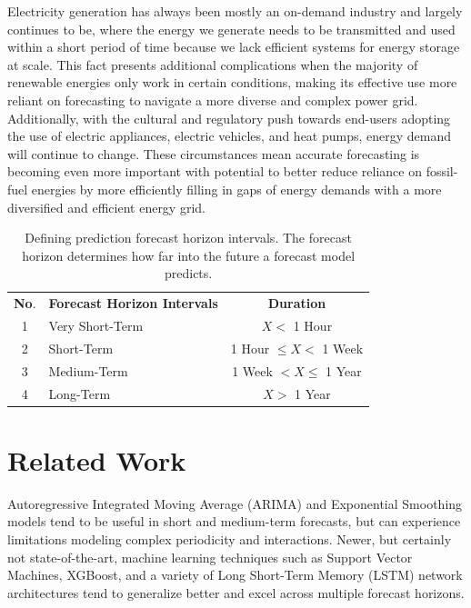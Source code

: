 \documentclass[sigconf]{acmart}
\begin{document}
Electricity generation has always been mostly an on-demand industry and largely continues to be, where the energy we generate needs to be transmitted and used within a short period of time because we lack efficient systems for energy storage at scale.\cite{Lai21} This fact presents additional complications when the majority of renewable energies only work in certain conditions, making its effective use more reliant on forecasting to navigate a more diverse and complex power grid. Additionally,  with the cultural and regulatory push towards end-users adopting the use of electric appliances, electric vehicles, and heat pumps, energy demand will continue to change.\cite{Archsmith22} These circumstances mean accurate forecasting is becoming even more important with potential to better reduce reliance on fossil-fuel energies by more efficiently filling in gaps of energy demands with a more diversified and efficient energy grid.

\begin{table}
\centering
\caption{Defining prediction forecast horizon intervals. The forecast horizon determines how far into the future a forecast model predicts.}
\begin{tabular}{clc}
\toprule
\hfill \textbf{No}. & \hfil \textbf{Forecast Horizon Intervals} & \textbf{Duration}\\
\cmidrule(lr){1-1}\cmidrule(rl){2-2}\cmidrule(rl){3-3}
  1 & Very Short-Term & $ X < $ 1 Hour \\
  2 & Short-Term  & 1 Hour $ \leq X < $ 1 Week  \\   
  3 & Medium-Term & 1 Week $ < X \leq $ 1 Year  \\   
  4 & Long-Term & $ X > $ 1 Year  \\ 
  \bottomrule
\end{tabular}
\end{table}

\section{Related Work}
Autoregressive Integrated Moving Average (ARIMA) and Exponential Smoothing models tend to be useful in short and medium-term forecasts, but can experience limitations modeling complex periodicity and interactions.\cite{Muzaffar19, Hopf23} Newer, but certainly not state-of-the-art, machine learning techniques such as Support Vector Machines, XGBoost, and a variety of Long Short-Term Memory (LSTM) network architectures tend to generalize better and excel across multiple forecast horizons.\cite{Sun22, Muzaffar19}
\end{document}
